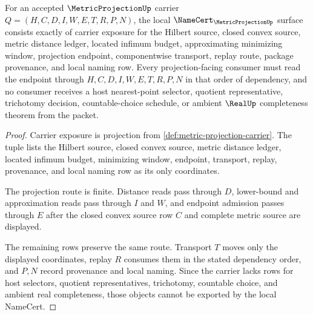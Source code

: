 \begin{theorem}\label{thm:metric-projection-namecert-obligations}
For an accepted $\MetricProjectionUp$ carrier $Q=(H,C,D,I,W,E,T,R,P,N)$, the local $\NameCert_{\MetricProjectionUp}$ surface consists exactly of carrier exposure for the Hilbert source, closed convex source, metric distance ledger, located infimum budget, approximating minimizing window, projection endpoint, componentwise transport, replay route, package provenance, and local naming row. Every projection-facing consumer must read the endpoint through $H,C,D,I,W,E,T,R,P,N$ in that order of dependency, and no consumer receives a host nearest-point selector, quotient representative, trichotomy decision, countable-choice schedule, or ambient $\RealUp$ completeness theorem from the packet.
\end{theorem}
\begin{proof}
Carrier exposure is projection from \autoref{def:metric-projection-carrier}. The tuple lists the Hilbert source, closed convex source, metric distance ledger, located infimum budget, minimizing window, endpoint, transport, replay, provenance, and local naming row as its only coordinates.

The projection route is finite. Distance reads pass through $D$, lower-bound and approximation reads pass through $I$ and $W$, and endpoint admission passes through $E$ after the closed convex source row $C$ and complete metric source are displayed.

The remaining rows preserve the same route. Transport $T$ moves only the displayed coordinates, replay $R$ consumes them in the stated dependency order, and $P,N$ record provenance and local naming. Since the carrier lacks rows for host selectors, quotient representatives, trichotomy, countable choice, and ambient real completeness, those objects cannot be exported by the local NameCert.
\end{proof}

